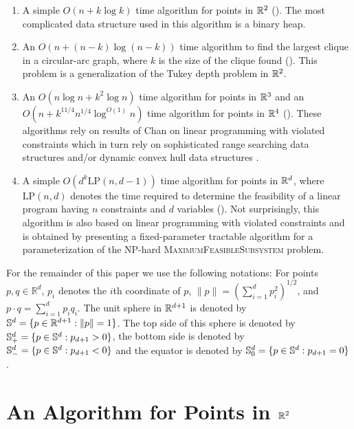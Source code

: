\documentclass[charterfonts,lotsofwhite]{patmorin}
\newcommand{\lp}{\mathrm{LP}}
\begin{document}
\begin{enumerate}
\item A simple $O(n + k\log k)$ time algorithm for points in $\mathbb{R}^2$
().  The most complicated data structure used in this
algorithm is a binary heap.

\item An $O(n + (n-k)\log(n-k))$ time algorithm to find the largest
clique in a circular-arc graph, where $k$ is the size of the clique
found ().  This problem is a generalization of the
Tukey depth problem in $\mathbb{R}^2$.

\item An $O(n\log n + k^2\log n)$ time algorithm for points in $\mathbb{R}^3$
and an $O(n + k^{11/4}n^{1/4}\log^{O(1)}n)$ time algorithm for points
in $\mathbb{R}^4$ ().  These algorithms rely on results of Chan
on linear programming with violated constraints \cite{c05} which in
turn rely on sophisticated range searching data structures
\cite{m92,r99} and/or dynamic convex hull data structures \cite{bj02}.

\item A simple $O(d^k \lp(n,d-1))$ time algorithm for points in
$\mathbb{R}^d$, where $\lp(n,d)$ denotes the time required to determine the
feasibility of a linear program having $n$ constraints and $d$
variables ().  Not surprisingly, this algorithm is also
based on linear programming with violated constraints and is obtained
by presenting a fixed-parameter tractable algorithm for a
parameterization of the NP-hard \textsc{MaximumFeasibleSubsystem}
problem.
\end{enumerate}

For the remainder of this paper we use the following notations: For
points $p,q\in\mathbb{R}^d$, $p_i$ denotes the $i$th coordinate of
$p$, $\|p\|=(\sum_{i=1}^d p_i^2)^{1/2}$, and $p\cdot
q=\sum_{i=1}^d p_iq_i$.  The unit sphere in $\mathbb{R}^{d+1}$ is denoted by
$\mathbb{S}^d =\{ p\in\mathbb{R}^{d+1} : \|p\|=1\}$. The top side of this sphere is
denoted by $\mathbb{S}^d_+ =\{ p\in\mathbb{S}^{d} : p_{d+1} > 0 \}$, the bottom
side is denoted by $\mathbb{S}^d_- =\{ p\in\mathbb{S}^{d} : p_{d+1} < 0 \}$ and the
equator is denoted by $\mathbb{S}^d_0 =\{ p\in\mathbb{S}^{d} : p_{d+1} = 0 \}$ .



\section{An Algorithm for Points in $\mathbb{R}^2$}
\end{document}
